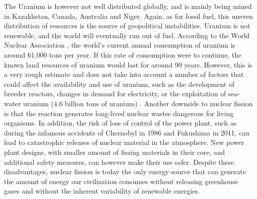 \documentclass[my_thesis.tex]{subfiles}
\begin{document}
The Uranium is however not well distributed globally, and is mainly being mined in Kazakhstan, Canada, Australia and Niger. Again, as for fossil fuel, this uneven distribution of resources is the source of geopolitical instabilities. Uranium is not renewable, and the world will eventually run out of fuel. According to the World Nuclear Association \citep{worldnuclearassociationUraniumSuppliesSupply2022}, the world's current annual consumption of uranium is around 61,000 tons per year. If this rate of consumption were to continue, the known land resources of uranium would last for around 90 years. However, this is a very rough estimate and does not take into account a number of factors that could affect the availability and use of uranium, such as the development of breeder reactors, changes in demand for electricity, or the exploitation of sea-water uranium ($4.6$ billion tons of uranium) \citep{dunganUraniumSeawaterInfinite2017}. Another downside to nuclear fission is that the reaction generates long-lived nuclear wastes dangerous for living organisms. In addition, the risk of loss of control of the power plant, such as during the infamous accidents of Chernobyl in 1986 and Fukushima in 2011, can lead to catastrophic releases of nuclear material in the atmosphere. New power plant designs, with smaller amount of fissing materials in their core, and additional safety measures, can however make their use safer.  Despite these disadvantages, nuclear fission is today the only energy source that can generate the amount of energy our civilization consumes without releasing greenhouse gases and without the inherent variability of renewable energies.
\end{document}

